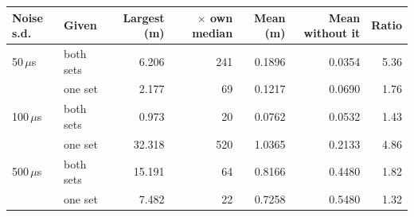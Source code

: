 \begin{tabular}{llrrrrr}
\toprule
Noise s.d. & Given & Largest (m) & $\times$ own median & Mean (m) & Mean without it & Ratio \\
\midrule
50\,$\mu$s & both sets & 6.206 & 241 & 0.1896 & 0.0354 & 5.36 \\
 & one set & 2.177 & 69 & 0.1217 & 0.0690 & 1.76 \\
100\,$\mu$s & both sets & 0.973 & 20 & 0.0762 & 0.0532 & 1.43 \\
 & one set & 32.318 & 520 & 1.0365 & 0.2133 & 4.86 \\
500\,$\mu$s & both sets & 15.191 & 64 & 0.8166 & 0.4480 & 1.82 \\
 & one set & 7.482 & 22 & 0.7258 & 0.5480 & 1.32 \\
\bottomrule
\end{tabular}
